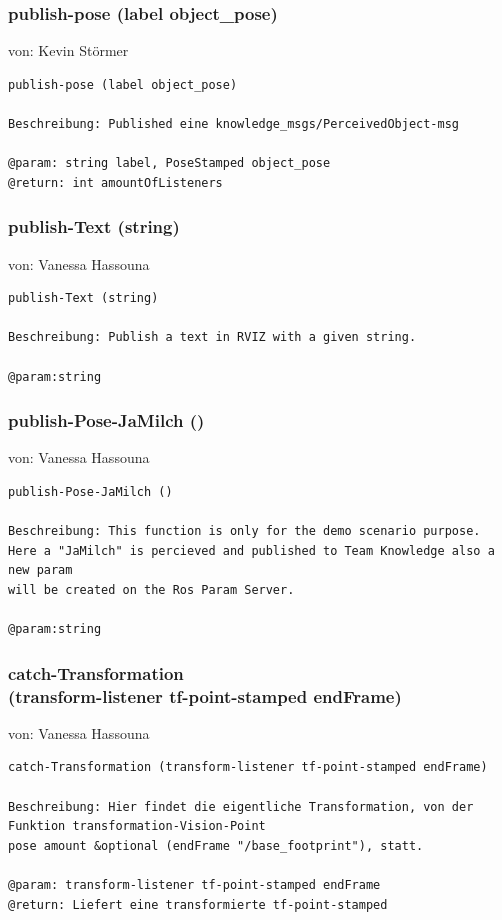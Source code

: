 \documentclass{suturo}
\makeatletter
\newcommand{\chapterauthor}[1]{%
  {\parindent0pt\vspace*{-27pt}%
  \linespread{0}\small\begin{flushright}von: #1\end{flushright}%
  \par\nobreak\vspace*{0pt}}
  \@afterheading%
}
\makeatother
\begin{document}
\subsubsection{publish-pose (label object\_pose)}
\chapterauthor{Kevin Störmer}
\begin{verbatim}
publish-pose (label object_pose)

Beschreibung: Published eine knowledge_msgs/PerceivedObject-msg

@param: string label, PoseStamped object_pose
@return: int amountOfListeners
\end{verbatim}


\subsubsection{ publish-Text (string)}
\chapterauthor{Vanessa Hassouna}
\begin{verbatim}
publish-Text (string)

Beschreibung: Publish a text in RVIZ with a given string.

@param:string
\end{verbatim}


\subsubsection{publish-Pose-JaMilch ()}
\chapterauthor{Vanessa Hassouna}
\begin{verbatim}
publish-Pose-JaMilch ()

Beschreibung: This function is only for the demo scenario purpose.
Here a "JaMilch" is percieved and published to Team Knowledge also a new param
will be created on the Ros Param Server.

@param:string
\end{verbatim}



\subsubsection{catch-Transformation \\
(transform-listener tf-point-stamped endFrame)}
\chapterauthor{Vanessa Hassouna}
\begin{verbatim}
catch-Transformation (transform-listener tf-point-stamped endFrame)

Beschreibung: Hier findet die eigentliche Transformation, von der
Funktion transformation-Vision-Point 
pose amount &optional (endFrame "/base_footprint"), statt.

@param: transform-listener tf-point-stamped endFrame
@return: Liefert eine transformierte tf-point-stamped
\end{verbatim}
\end{document}

